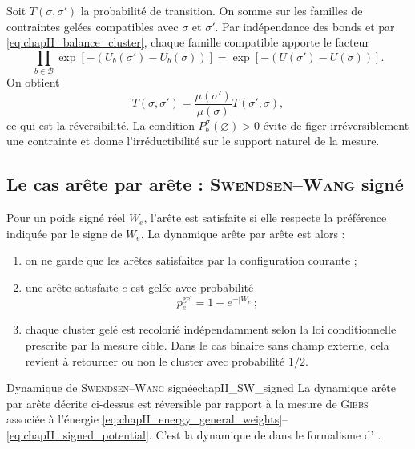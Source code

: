 \begin{Preuve}
Soit $T(\sigma,\sigma')$ la probabilité de transition. On somme sur les familles de contraintes gelées compatibles avec $\sigma$ et $\sigma'$. Par indépendance des bonds et par \eqref{eq:chapII_balance_cluster}, chaque famille compatible apporte le facteur
\[
    \prod_{b\in\mathcal B}\exp[-(U_b(\sigma')-U_b(\sigma))]
    =
    \exp[-(U(\sigma')-U(\sigma))].
\]
On obtient
\[
    T(\sigma,\sigma')=\frac{\mu(\sigma')}{\mu(\sigma)}T(\sigma',\sigma),
\]
ce qui est la réversibilité. La condition $P_b^\sigma(\varnothing)>0$ évite de figer irréversiblement une contrainte et donne l'irréductibilité sur le support naturel de la mesure.
\end{Preuve}

\subsection{Le cas arête par arête : \textsc{Swendsen--Wang} signé}

Pour un poids signé réel $W_e$, l'arête est satisfaite si elle respecte la préférence indiquée par le signe de $W_e$. La dynamique arête par arête est alors :
\begin{enumerate}
    \item on ne garde que les arêtes satisfaites par la configuration courante ;
    \item une arête satisfaite $e$ est gelée avec probabilité
    \begin{equation}
        p_e^{\mathrm{gel}}=1-e^{-|W_e|};
        \label{eq:chapII_freeze_edge_weight}
    \end{equation}
    \item chaque cluster gelé est recolorié indépendamment selon la loi conditionnelle prescrite par la mesure cible. Dans le cas binaire sans champ externe, cela revient à retourner ou non le cluster avec probabilité $1/2$.
\end{enumerate}

\begin{Resultat}{Dynamique de \textsc{Swendsen--Wang} signée}{chapII_SW_signed}
La dynamique arête par arête décrite ci-dessus est réversible par rapport à la mesure de \textsc{Gibbs} associée à l'énergie \eqref{eq:chapII_energy_general_weights}--\eqref{eq:chapII_signed_potential}. C'est la dynamique de \SW{} dans le formalisme d'\ES{} \cite{SwendsenWang,EdwardsSokal}.
\end{Resultat}

